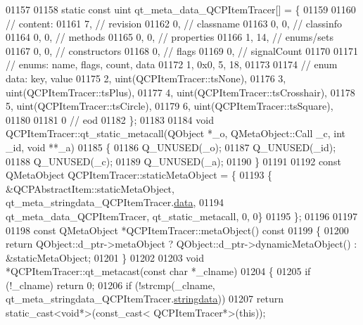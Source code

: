 \begin{DoxyCode}
01157 
01158 \textcolor{keyword}{static} \textcolor{keyword}{const} uint qt\_meta\_data\_QCPItemTracer[] = \{
01159 
01160  \textcolor{comment}{// content:}
01161        7,       \textcolor{comment}{// revision}
01162        0,       \textcolor{comment}{// classname}
01163        0,    0, \textcolor{comment}{// classinfo}
01164        0,    0, \textcolor{comment}{// methods}
01165        0,    0, \textcolor{comment}{// properties}
01166        1,   14, \textcolor{comment}{// enums/sets}
01167        0,    0, \textcolor{comment}{// constructors}
01168        0,       \textcolor{comment}{// flags}
01169        0,       \textcolor{comment}{// signalCount}
01170 
01171  \textcolor{comment}{// enums: name, flags, count, data}
01172        1, 0x0,    5,   18,
01173 
01174  \textcolor{comment}{// enum data: key, value}
01175        2, uint(QCPItemTracer::tsNone),
01176        3, uint(QCPItemTracer::tsPlus),
01177        4, uint(QCPItemTracer::tsCrosshair),
01178        5, uint(QCPItemTracer::tsCircle),
01179        6, uint(QCPItemTracer::tsSquare),
01180 
01181        0        \textcolor{comment}{// eod}
01182 \};
01183 
01184 \textcolor{keywordtype}{void} QCPItemTracer::qt\_static\_metacall(QObject *\_o, QMetaObject::Call \_c, \textcolor{keywordtype}{int} \_id, \textcolor{keywordtype}{void} **\_a)
01185 \{
01186     Q\_UNUSED(\_o);
01187     Q\_UNUSED(\_id);
01188     Q\_UNUSED(\_c);
01189     Q\_UNUSED(\_a);
01190 \}
01191 
01192 \textcolor{keyword}{const} QMetaObject QCPItemTracer::staticMetaObject = \{
01193     \{ &QCPAbstractItem::staticMetaObject, qt\_meta\_stringdata\_QCPItemTracer.\hyperlink{a00016_a87c91fdce2044ef334c2cfd91e38ac00}{data},
01194       qt\_meta\_data\_QCPItemTracer,  qt\_static\_metacall, 0, 0\}
01195 \};
01196 
01197 
01198 \textcolor{keyword}{const} QMetaObject *QCPItemTracer::metaObject()\textcolor{keyword}{ const}
01199 \textcolor{keyword}{}\{
01200     \textcolor{keywordflow}{return} QObject::d\_ptr->metaObject ? QObject::d\_ptr->dynamicMetaObject() : &staticMetaObject;
01201 \}
01202 
01203 \textcolor{keywordtype}{void} *QCPItemTracer::qt\_metacast(\textcolor{keyword}{const} \textcolor{keywordtype}{char} *\_clname)
01204 \{
01205     \textcolor{keywordflow}{if} (!\_clname) \textcolor{keywordflow}{return} 0;
01206     \textcolor{keywordflow}{if} (!strcmp(\_clname, qt\_meta\_stringdata\_QCPItemTracer.\hyperlink{a00016_a28c4c1cde887cbe6b6af18ce9d6ed867}{stringdata}))
01207         \textcolor{keywordflow}{return} \textcolor{keyword}{static\_cast<}\textcolor{keywordtype}{void}*\textcolor{keyword}{>}(\textcolor{keyword}{const\_cast<} QCPItemTracer*\textcolor{keyword}{>}(\textcolor{keyword}{this}));

\end{DoxyCode}
